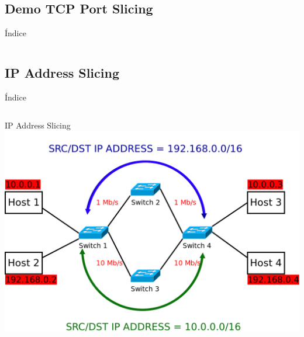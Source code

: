 \documentclass{beamer}
\begin{document}
\subsection{Demo TCP Port Slicing}
\begin{frame}{Índice}
    \begin{columns}[t]
        \begin{column}{1.7in}
            \tableofcontents[currentsection, subsectionstyle=show/shaded/hide, sections={1-4}]
        \end{column}
        \begin{column}{1.7in}
            \tableofcontents[currentsection, subsectionstyle=show/shaded/hide, sections={5-7}]
        \end{column}
    \end{columns}
\end{frame}

\subsection{IP Address Slicing}
\begin{frame}{Índice}
    \begin{columns}[t]
        \begin{column}{1.7in}
            \tableofcontents[currentsection, subsectionstyle=show/shaded/hide, sections={1-4}]
        \end{column}
        \begin{column}{1.7in}
            \tableofcontents[currentsection, subsectionstyle=show/shaded/hide, sections={5-7}]
        \end{column}
    \end{columns}
\end{frame}

\begin{frame}{IP Address Slicing}
    \centering
    \includegraphics[scale=0.22]{mininet_topology_IP_slicing.png}
\end{frame}
\end{document}
